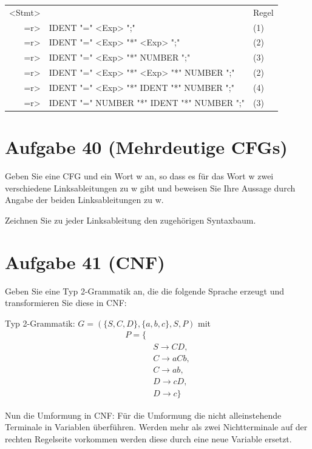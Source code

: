 \documentclass{article}
\begin{document}
\begin{center}
	\begin{tabular}{rll}
		<Stmt> & & Regel \\
		=r> & IDENT "=" <Exp> ";" & (1) \\
		=r> & IDENT "=" <Exp> "*" <Exp> ";" & (2)\\
		=r> & IDENT "=" <Exp> "*" NUMBER ";" & (3)\\
		=r> & IDENT "=" <Exp> "*" <Exp> "*" NUMBER ";" & (2)\\
		=r> & IDENT "=" <Exp> "*" IDENT "*" NUMBER ";" & (4)\\
		=r> & IDENT "=" NUMBER "*" IDENT "*" NUMBER ";" & (3)\\
	\end{tabular}
\end{center}


\section*{Aufgabe 40 (Mehrdeutige CFGs)}
Geben Sie eine CFG und ein Wort w an, so dass es für das Wort w zwei verschiedene Linksableitungen zu w gibt und beweisen Sie Ihre Aussage durch Angabe der beiden Linksableitungen zu w.

Zeichnen Sie zu jeder Linksableitung den zugehörigen Syntaxbaum.


\section*{Aufgabe 41 (CNF)}

Geben Sie eine Typ 2-Grammatik an, die die folgende Sprache erzeugt und transformieren Sie
diese in CNF:

Typ 2-Grammatik:
$G = (\{S, C, D\}, \{a, b, c\}, S, P)$ mit
\begin{equation}
\begin{split}
P = \{ \\\
&S \rightarrow CD, \\\
&C \rightarrow aCb, \\\
&C \rightarrow ab, \\\
&D \rightarrow cD, \\\
&D \rightarrow c \}
\end{split}
\end{equation}

Nun die Umformung in CNF:
Für die Umformung die nicht alleinstehende Terminale in Variablen überführen. Werden mehr als zwei Nichtterminale auf der rechten Regelseite vorkommen werden diese durch eine neue Variable ersetzt.
\end{document}
